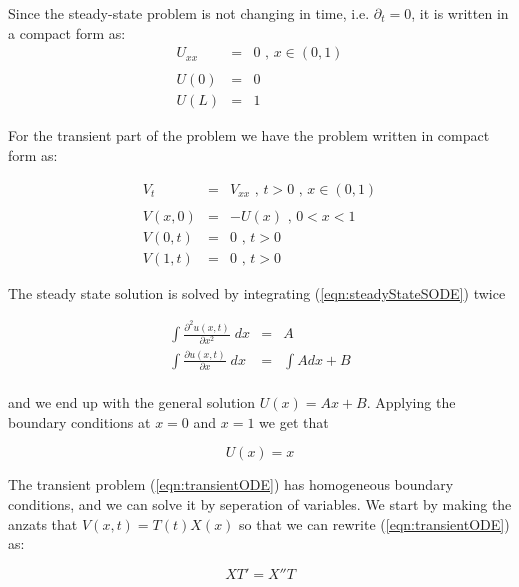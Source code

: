 \documentclass{article}
\begin{document}
Since the steady-state problem is not changing in time, i.e. $\partial_ t = 0$, it is written in a compact form as:
\begin{subequations}
	\begin{eqnarray}
	\label{eqn:steadyStateSODE}
	U_{xx} &=& 0 \textit{ , } x \in (0,1)\\ \nonumber
	\\
	U(0) &=& 0 \textit{  } \\
	U(L) &=& 1
	\end{eqnarray}
\end{subequations}

For the transient part of the problem we have the problem written in compact form as:

\begin{subequations}
	\begin{eqnarray}
	\label{eqn:transientODE}
	V_t &=& V_{xx} \textit{ , } t>0 \textit{ , } x \in (0,1) \\ \nonumber
	\\
	\label{eqn:transientIC}
	V(x,0) &=& -U(x) \textit{ , } 0<x<1 \\
	V(0,t) &=& 0 \textit{ , } t>0 \\
	V(1,t) &=& 0 \textit{ , } t>0
	\end{eqnarray}
\end{subequations}


The steady state solution is solved by integrating (\ref{eqn:steadyStateSODE}) twice

\begin{eqnarray}
\nonumber
\int \frac{\partial^2 u(x,t)}{\partial x^2}\;dx &=& A \\ \nonumber
\int \frac{\partial u(x,t)}{\partial x}\;dx &=& \int Adx +B \\ \nonumber
\end{eqnarray}

and we end up with the general solution $U(x) = Ax + B$. Applying the boundary conditions at $x=0$ and $x=1$ we get that 

\begin{equation}
U(x) = x
\label{eqn:UsteadyState1D}
\end{equation}

The transient problem (\ref{eqn:transientODE}) has homogeneous boundary conditions, and we can solve it by seperation of variables. We start by making the anzats that $V(x,t) = T(t)X(x)$ so that we can rewrite (\ref{eqn:transientODE}) as:

\begin{equation}
XT'=X''T 
\end{equation}
\end{document}

